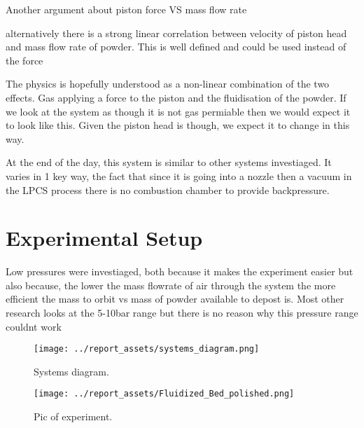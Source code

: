 Another argument about piston force VS mass flow rate

alternatively there is a strong linear correlation between velocity of piston head and mass flow rate of powder. This is well defined and could be used instead of the force


The physics is hopefully understood as a non-linear combination of the two effects. Gas applying a force to the piston and the fluidisation of the powder. If we look at the system as though it is not gas permiable then we would expect it to look like this. Given the piston head is though, we expect it to change in this way.

At the end of the day, this system is similar to other systems investiaged. It varies in 1 key way, the fact that since it is going into a nozzle then a vacuum in the LPCS process there is no combustion chamber to provide backpressure.
\newpage
\section{Experimental Setup}
Low pressures were investiaged, both because it makes the experiment easier but also because, the lower the mass flowrate of air through the system the more efficient the mass to orbit vs mass of powder available to depost is. Most other research looks at the 5-10bar range but there is no reason why this pressure range couldnt work
\begin{figure}[htbp]
    \centering

    \begin{minipage}{0.95\textwidth}
        \centering
        \texttt{[image: ../report\_assets/systems\_diagram.png]}
        \caption{Systems diagram.}\label{fig:systems-diagram}
    \end{minipage}
    \hfill
    \begin{minipage}{0.45\textwidth}
        \centering
        \texttt{[image: ../report\_assets/Fluidized\_Bed\_polished.png]}
        \caption{Pic of experiment.}\label{fig:experiment-image}
    \end{minipage}

\end{figure}

\newpage
